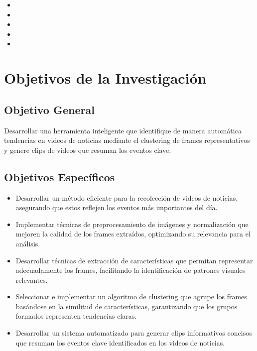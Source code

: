 \begin{itemize}
	\item \Pbone
	\item \Pbtwo
	\item \Pbthree
	\item \Pbfour
	\item \Pbfive
\end{itemize}

\section{Objetivos de la Investigación}
\subsection{Objetivo General}
\newcommand{\ObjetivoGeneral}{
	Desarrollar una herramienta inteligente que identifique de manera automática tendencias en videos de noticias mediante el clustering de frames representativos y genere clips de videos que resuman los eventos clave.
}
\ObjetivoGeneral

\subsection{Objetivos Espec\'{i}ficos}
\newcommand{\Objone}{
	Desarrollar un método eficiente para la recolección de videos de noticias, asegurando que estos reflejen los eventos más importantes del día.
}
\newcommand{\Objtwo}{
	Implementar técnicas de preprocesamiento de imágenes y normalización que mejoren la calidad de los frames extraídos, optimizando su relevancia para el análisis.
}
\newcommand{\Objthree}{
	Desarrollar técnicas de extracción de características que permitan representar adecuadamente los frames, facilitando la identificación de patrones visuales relevantes.
}
\newcommand{\Objtfour}{
	Seleccionar e implementar un algoritmo de clustering que agrupe los frames basándose en la similitud de características, garantizando que los grupos formados representen tendencias claras.
}
\newcommand{\Objtfive}{
	Desarrollar un sistema automatizado para generar clips informativos concisos que resuman los eventos clave identificados en los videos de noticias.
}


\begin{itemize}
	\item {\Objone}
	\item {\Objtwo}
	\item {\Objthree}
	\item {\Objtfour}
	\item {\Objtfive}
\end{itemize}

